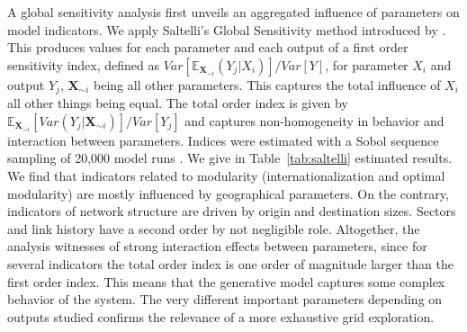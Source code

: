 \documentclass[11pt]{article}
\begin{document}
A global sensitivity analysis first unveils an aggregated influence of parameters on model indicators. We apply Saltelli's Global Sensitivity method introduced by \cite{saltelli2008global}. This produces values for each parameter and each output of a first order sensitivity index, defined as $Var\left[\mathbb{E}_{\mathbf{X}_{\sim i}}\left(Y_j | X_i\right)\right] / Var\left[Y\right]$, for parameter $X_i$ and output $Y_j$, $\mathbf{X}_{\sim i}$ being all other parameters. This captures the total influence of $X_i$ all other things being equal. The total order index is given by $\mathbb{E}_{\mathbf{X}_{\sim i}} \left[Var(Y_j | \mathbf{X}_{\sim i})\right] / Var\left[Y_j\right]$ and captures non-homogeneity in behavior and interaction between parameters. Indices were estimated with a Sobol sequence sampling of 20,000 model runs \cite{saltelli2010variance}. We give in Table~\ref{tab:saltelli} estimated results. We find that indicators related to modularity (internationalization and optimal modularity) are mostly influenced by geographical parameters. On the contrary, indicators of network structure are driven by origin and destination sizes. Sectors and link history have a second order by not negligible role. Altogether, the analysis witnesses of strong interaction effects between parameters, since for several indicators the total order index is one order of magnitude larger than the first order index. This means that the generative model captures some complex behavior of the system. The very different important parameters depending on outputs studied confirms the relevance of a more exhaustive grid exploration.
\end{document}
